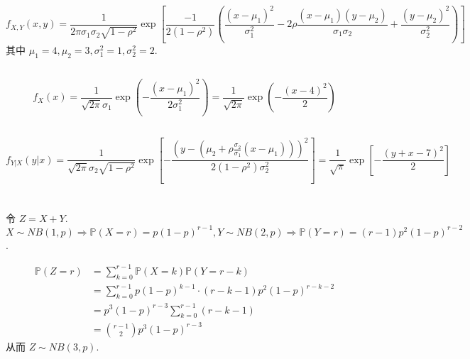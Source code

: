 \documentclass[8pt]{article}
\theoremstyle{compact}
\def\P#1{\mathbb{P}\left({#1}\right)}
\begin{document}
\section{}
\subsection{}
\begin{equation}
	f_{X, Y}(x, y) = \frac{1}{2\pi\sigma_1\sigma_2\sqrt{1 - \rho^2}} \exp\left[\frac{-1}{2(1 - \rho^2)}\left(\frac{(x - \mu_1)^2}{\sigma_1^2} - 2\rho\frac{(x - \mu_1)(y - \mu_2)}{\sigma_1\sigma_2} + \frac{(y - \mu_2)^2}{\sigma_2^2}\right)\right]
\end{equation}
其中 $\mu_1 = 4, \mu_2 = 3, \sigma_1^2 = 1, \sigma_2^2 = 2$.
\subsection{}
\begin{equation}
	f_X(x) = \frac{1}{\sqrt{2\pi}\sigma_1}\exp\left(-\frac{(x - \mu_1)^2}{2\sigma_1^2}\right) = \frac{1}{\sqrt{2\pi}}\exp\left(-\frac{(x - 4)^2}{2}\right)
\end{equation}
\subsection{}
\begin{equation}
	f_{Y|X}(y | x) = \frac{1}{\sqrt{2\pi}\sigma_2\sqrt{1 - \rho^2}}\exp\left[ -\frac{\left(y - (\mu_2 + \rho\frac{\sigma_2}{\sigma_1}(x - \mu_1))\right)^2}{2(1 - \rho^2)\sigma_2^2} \right] = \frac{1}{\sqrt{\pi}}\exp\left[ -\frac{\left(y + x - 7\right)^2}{2} \right]
\end{equation}


\section{}
令 $Z = X + Y$. $X \sim NB(1, p) \Rightarrow \P{X = r} = p(1-p)^{r-1}, Y \sim NB(2, p) \Rightarrow \P{Y = r} = (r-1)p^2(1-p)^{r-2}$.

\begin{equation}
	\begin{split}
		\P{Z = r} &= \sum_{k=0}^{r-1}\P{X = k} \P{Y = r - k} \\
		&= \sum_{k=0}^{r-1}p(1-p)^{k-1} \cdot (r-k-1)p^2(1-p)^{r-k-2}\\
		&= p^3(1-p)^{r-3}\sum_{k=0}^{r-1}(r-k-1)\\
		&= \binom{r-1}{2}p^3(1-p)^{r-3}
	\end{split}
\end{equation}
从而 $Z \sim NB(3, p)$.
\end{document}
